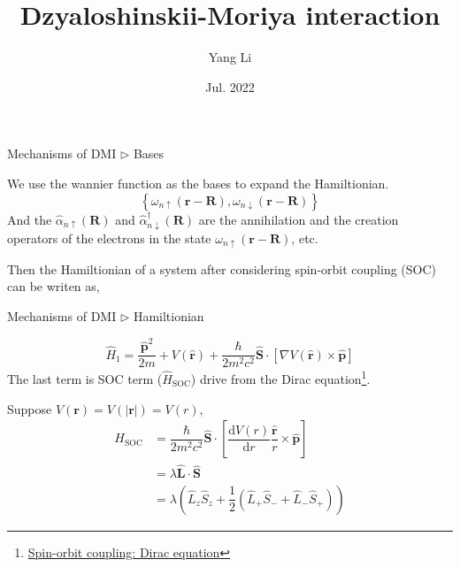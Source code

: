 \documentclass{beamer}
\title[DMI]{Dzyaloshinskii-Moriya interaction}
\author[Yang Li]{
  Yang Li\inst{1}}
\institute[CMT Tsinghua Univ.]{
  \inst{1} Department of Physics\\Tsinghua University 
}
\date[Jul. 2022]{Jul. 2022}
\begin{document}
  \frame{\titlepage}
  
  \begin{frame}{Mechanisms of DMI \(\rhd\) Bases}
    \begin{block}{}
    We use the wannier function as the bases to expand the Hamiltionian. 
    \begin{equation}
      \left\{\omega_{n\uparrow}(\bm{r}-\bm{R}), \omega_{n\downarrow}(\bm{r}-\bm{R})\right\}
    \end{equation}
    And the \(\widehat{\alpha}_{n\uparrow}(\bm{R})\) and \(\widehat{\alpha}_{n\downarrow}^\dagger(\bm{R})\) are the annihilation and the creation operators of the electrons in the state \(\omega_{n\uparrow}(\bm{r}-\bm{R})\), etc.\\
    \end{block}

    Then the Hamiltionian of a system after considering spin-orbit coupling (SOC) can be writen as, 
  \end{frame}

  \begin{frame}{Mechanisms of DMI \(\rhd\) Hamiltionian} 
    \begin{block}{}
      \begin{equation}
        \widehat{H}_1 = \dfrac{\widehat{\bm{p}}^2}{2m} + V(\widehat{\bm{r}}) + \dfrac{\hbar}{2m^2c^2}\widehat{\bm{S}}\cdot[\nabla{}V(\widehat{\bm{r}})\times\widehat{\bm{p}}]
      \end{equation}
      The last term is SOC term (\(\widehat{H}_{\text{SOC}}\)) drive from the Dirac equation\footnote{\tiny\href{http://alma.karlov.mff.cuni.cz/hamrle/teaching/lectures/hamrle_spin-orbit-coupling.pdf}{Spin-orbit coupling: Dirac equation}}. 
    \end{block}
  
    Suppose \(V(\bm{r}) = V(|\bm{r}|) = V(r)\),
    \begin{equation}\begin{aligned}
      H_{\text{SOC}} &= \dfrac{\hbar}{2m^2c^2}\widehat{\bm{S}}\cdot[\dfrac{\mathrm{d}V(r)}{\mathrm{d}r}\dfrac{\widehat{\bm{r}}}{r}\times\widehat{\bm{p}}]\\
      &= \lambda\widehat{\bm{L}}\cdot\widehat{\bm{S}}\\
      &= \lambda\left(\widehat{L}_z\widehat{S}_z + \dfrac{1}{2}(\widehat{L}_+\widehat{S}_-+\widehat{L}_-\widehat{S}_+)\right)
    \end{aligned}\end{equation}


  \end{frame}
\end{document}
